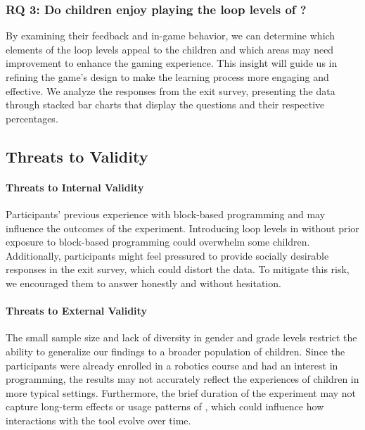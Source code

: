 
\subsubsection{RQ 3: Do children enjoy playing the loop levels of \toolname?}

By examining their feedback and in-game behavior, we can determine which elements of the loop levels appeal to the children and which areas may need improvement to enhance the gaming experience. This insight will guide us in refining the game's design to make the learning process more engaging and effective. We analyze the responses from the exit survey, presenting the data through stacked bar charts that display the questions and their respective percentages.
%

\subsection{Threats to Validity} 

\paragraph{Threats to Internal Validity} Participants' previous experience with block-based programming and \toolname may influence the outcomes of the experiment. Introducing loop levels in \toolname without prior exposure to block-based programming could overwhelm some children. Additionally, participants might feel pressured to provide socially desirable responses in the exit survey, which could distort the data. To mitigate this risk, we encouraged them to answer honestly and without hesitation.

\paragraph{Threats to External Validity} The small sample size and lack of diversity in gender and grade levels restrict the ability to generalize our findings to a broader population of children. Since the participants were already enrolled in a robotics course and had an interest in programming, the results may not accurately reflect the experiences of children in more typical settings. Furthermore, the brief duration of the experiment may not capture long-term effects or usage patterns of \toolname, which could influence how interactions with the tool evolve over time.


